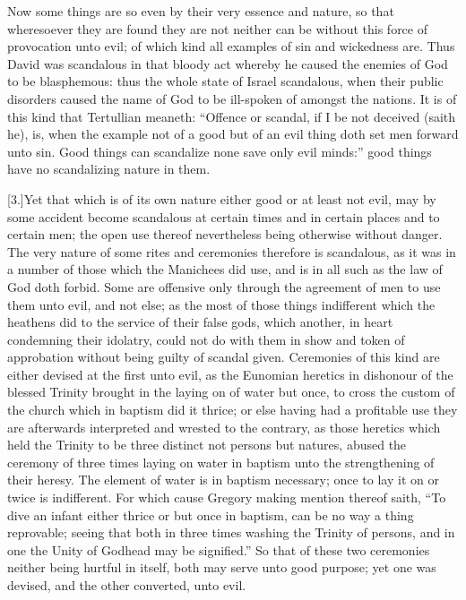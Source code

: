 Now some things are so even by their very essence and nature, so that wheresoever they are found they are not neither can be without this force of provocation unto evil; of which kind all examples of sin and wickedness are. Thus David was scandalous in that bloody act whereby he caused the enemies of God to be blasphemous: thus the whole state of Israel scandalous, when their public disorders caused the name of God to be ill-spoken of amongst the nations. It is of this  kind that Tertullian meaneth: “Offence or scandal, if I be not deceived (saith he), is, when the example not of a good but of an evil thing doth set men forward unto sin. Good things can scandalize none save only evil minds:” good things have no scandalizing nature in them.

[3.]Yet that which is of its own nature either good or at least not evil, may by some accident become scandalous at certain times and in certain places and to certain men; the open use thereof nevertheless being otherwise without danger. The very nature of some rites and ceremonies therefore is scandalous, as it was in a number of those which the Manichees did use, and is in all such as the law of God doth forbid. Some are offensive only through the agreement of men to use them unto evil, and not else; as the most of those things indifferent which the heathens did to the service of their false gods, which another, in heart condemning their idolatry, could not do with them in show and token of approbation without being guilty of scandal given. Ceremonies of this kind are either devised at the first unto evil, as the Eunomian heretics in dishonour of the blessed Trinity brought in the laying on of water but once, to cross the custom of the church which in baptism did it thrice; or else having had a profitable use they are afterwards interpreted and wrested to the contrary, as those heretics which held the Trinity to be three distinct not persons but natures, abused the ceremony of three times laying on water in baptism unto the strengthening of their heresy. The element of water is in baptism necessary; once to lay it on or twice is indifferent. For which cause Gregory making mention thereof saith, “To dive an infant  either thrice or but once in baptism, can be no way a thing reprovable; seeing that both in three times washing the Trinity of persons, and in one the Unity of Godhead may be signified.” So that of these two ceremonies neither being hurtful in itself, both may serve unto good purpose; yet one was devised, and the other converted, unto evil.

